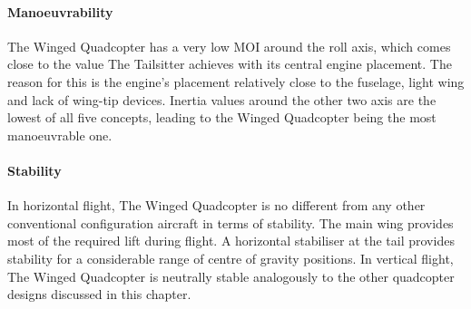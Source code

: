\paragraph{Manoeuvrability}

The Winged Quadcopter has a very low MOI around the roll axis, which comes close to the value The Tailsitter achieves with its central engine placement. The reason for this is the engine's placement relatively close to the fuselage, light wing and lack of wing-tip devices. Inertia values around the other two axis are the lowest of all five concepts, leading to the Winged Quadcopter being the most manoeuvrable one. 

\paragraph{Stability}

In horizontal flight, The Winged Quadcopter is no different from any other conventional configuration aircraft in terms of stability. The main wing provides most of the required lift during flight. A horizontal stabiliser at the tail provides stability for a considerable range of centre of gravity positions.
In vertical flight, The Winged Quadcopter is neutrally stable analogously to the other quadcopter designs discussed in this chapter.

